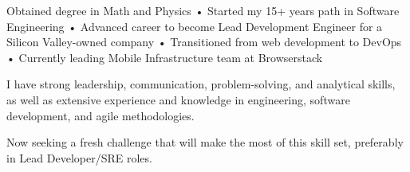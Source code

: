 

\begin{cvparagraph}


Obtained degree in Math and Physics • Started my 15+ years path in Software Engineering • Advanced career to become Lead Development Engineer for a Silicon Valley-owned company • Transitioned from web development to DevOps • Currently leading Mobile Infrastructure team at Browserstack

I have strong leadership, communication, problem-solving, and analytical skills, as well as extensive experience and knowledge in engineering, software development, and agile methodologies.

Now seeking a fresh challenge that will make the most of this skill set, preferably in Lead Developer/SRE roles.


\end{cvparagraph}
